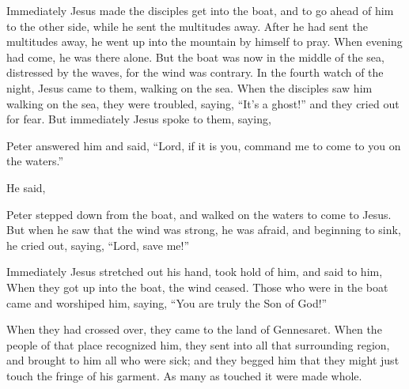 {\par }{\PP {}Immediately Jesus made the disciples get into the boat, and to go ahead of him to the other side, while he sent the multitudes away.
After he had sent the multitudes away, he went up into the mountain by himself to pray. When evening had come, he was there alone.
But the boat was now in the middle of the sea, distressed by the waves, for the wind was contrary.
In the fourth watch of the night, Jesus came to them, walking on the sea.
When the disciples saw him walking on the sea, they were troubled, saying, “It’s a ghost!” and they cried out for fear.
But immediately Jesus spoke to them, saying,
{}
{}
\par }{\PP {}Peter answered him and said, “Lord, if it is you, command me to come to you on the waters.”
\par }{\PP {}He said,
{}
\par }{\PP Peter stepped down from the boat, and walked on the waters to come to Jesus.
But when he saw that the wind was strong, he was afraid, and beginning to sink, he cried out, saying, “Lord, save me!”
\par }{\PP {}Immediately Jesus stretched out his hand, took hold of him, and said to him,
{}
When they got up into the boat, the wind ceased.
Those who were in the boat came and worshiped him, saying, “You are truly the Son of God!”
\par }{\PP {}When they had crossed over, they came to the land of Gennesaret.
When the people of that place recognized him, they sent into all that surrounding region, and brought to him all who were sick;
and they begged him that they might just touch the fringe of his garment. As many as touched it were made whole.

}
